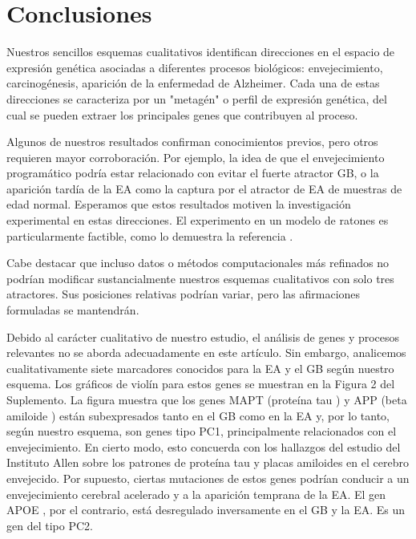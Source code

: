 \chapter*{Conclusiones}\label{conclutions}
\onehalfspacing

Nuestros sencillos esquemas cualitativos identifican direcciones en el espacio de expresión genética asociadas a diferentes procesos biológicos: envejecimiento, carcinogénesis, aparición de la enfermedad de Alzheimer. Cada una de estas direcciones se caracteriza por un "metagén" o perfil de expresión genética, del cual se pueden extraer los principales genes que contribuyen al proceso.

Algunos de nuestros resultados confirman conocimientos previos, pero otros requieren mayor corroboración. Por ejemplo, la idea de que el envejecimiento programático podría estar relacionado con evitar el fuerte atractor GB, o la aparición tardía de la EA como la captura por el atractor de EA de muestras de edad normal. Esperamos que estos resultados motiven la investigación experimental en estas direcciones. El experimento en un modelo de ratones es particularmente factible, como lo demuestra la referencia \cite{hahn2023atlas}.

Cabe destacar que incluso datos o métodos computacionales más refinados no podrían modificar sustancialmente nuestros esquemas cualitativos con solo tres atractores. Sus posiciones relativas podrían variar, pero las afirmaciones formuladas se mantendrán.

Debido al carácter cualitativo de nuestro estudio, el análisis de genes y procesos relevantes no se aborda adecuadamente en este artículo. Sin embargo, analicemos cualitativamente siete marcadores conocidos para la EA y el GB según nuestro esquema. Los gráficos de violín para estos genes se muestran en \alert{la Figura 2 del Suplemento}. La figura muestra que los genes MAPT (proteína tau \cite{Strang_2019}) y APP (beta amiloide \cite{TCW_2016}) están subexpresados tanto en el GB como en la EA y, por lo tanto, según nuestro esquema, son genes tipo PC1, principalmente relacionados con el envejecimiento. En cierto modo, esto concuerda con los hallazgos del estudio del Instituto Allen sobre los patrones de proteína tau y placas amiloides en el cerebro envejecido. Por supuesto, ciertas mutaciones de estos genes podrían conducir a un envejecimiento cerebral acelerado y a la aparición temprana de la EA. El gen APOE \cite{Raulin_2022}, por el contrario, está desregulado inversamente en el GB y la EA. Es un gen del tipo PC2.

